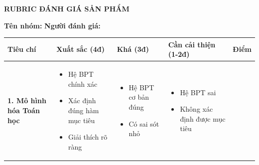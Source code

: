\documentclass[12pt,a4paper]{article}
\begin{document}
\newpage
\begin{center}
{\Large\bfseries\sffamily\color{primary} RUBRIC ĐÁNH GIÁ SẢN PHẨM}
\end{center}

\vspace{0.3cm}
\noindent\textbf{Tên nhóm:} \underline{\hspace{4cm}} \hfill \textbf{Người đánh giá:} \underline{\hspace{4cm}}

\vspace{0.5cm}
\begin{tabularx}{\textwidth}{|>{\raggedright\arraybackslash}p{2.8cm}|>{\raggedright\arraybackslash}X|>{\raggedright\arraybackslash}X|>{\raggedright\arraybackslash}X|c|}
\hline
\rowcolor{TableHeader}
\sffamily\bfseries Tiêu chí & \sffamily\bfseries Xuất sắc (4đ) & \sffamily\bfseries Khá (3đ) & \sffamily\bfseries Cần cải thiện (1-2đ) & \sffamily\bfseries Điểm \\
\hline

\textbf{1. Mô hình hóa Toán học} 
& 
\begin{itemize}[leftmargin=*,noitemsep,topsep=0pt]
    \item Hệ BPT chính xác
    \item Xác định đúng hàm mục tiêu
    \item Giải thích rõ ràng
\end{itemize}
& 
\begin{itemize}[leftmargin=*,noitemsep,topsep=0pt]
    \item Hệ BPT cơ bản đúng
    \item Có sai sót nhỏ
\end{itemize}
& 
\begin{itemize}[leftmargin=*,noitemsep,topsep=0pt]
    \item Hệ BPT sai
    \item Không xác định được mục tiêu
\end{itemize}
& \underline{\hspace{1cm}} \\
\hline


\end{tabularx}
\end{document}
